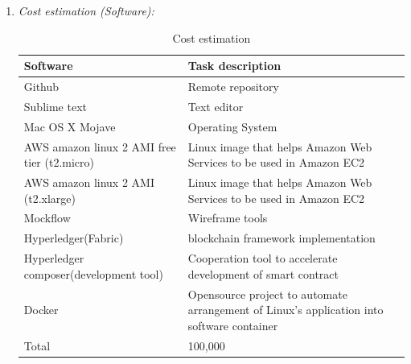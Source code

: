 \documentclass[conference]{IEEEtran}
\begin{document}
\begin{enumerate} [font=\itshape]
  \item \textit{Cost estimation (Software): } 
  \begin{table}[htbp]
  \renewcommand{\arraystretch}{1.5}
\caption{Cost estimation}
\begin{center}
\begin{tabular}{|p{3cm}|p{4.7cm}|}
\hline
\textbf{Software         } & \textbf{Task description        } \\
\hline
Github & Remote repository \\
\hline
Sublime text & Text editor \\
\hline
Mac OS X Mojave & Operating System \\
\hline
AWS amazon linux 2 AMI free tier (t2.micro) & Linux image that helps Amazon Web Services to be used in Amazon EC2 \\
\hline
AWS amazon linux 2 AMI (t2.xlarge) & Linux image that helps Amazon Web Services to be used in Amazon EC2  \\
\hline
 Mockflow & Wireframe tools \\
\hline
Hyperledger(Fabric) & blockchain framework implementation \\
\hline
Hyperledger composer(development tool) & Cooperation tool to accelerate development of smart contract \\
\hline
Docker & Opensource project to automate arrangement of Linux's application into software container \\
\hline
Total & 100,000\\
\hline
\end{tabular}
\label{tab1}
\end{center}
\end{table}
\end{enumerate}
\end{document}

